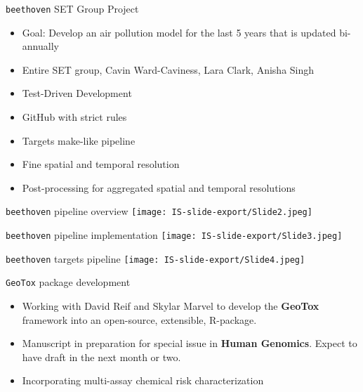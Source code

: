 \documentclass[
  ignorenonframetext,
]{beamer}
\providecommand{\tightlist}{%
  \setlength{\itemsep}{0pt}\setlength{\parskip}{0pt}}\usepackage{longtable,booktabs,array}
\begin{document}
\begin{frame}{\texttt{beethoven} SET Group Project}
\label{beethoven-set-group-project}
\begin{itemize}
\tightlist
\item
  Goal: Develop an air pollution model for the last 5 years that is
  updated bi-annually
\item
  Entire SET group, Cavin Ward-Caviness, Lara Clark, Anisha Singh
\item
  Test-Driven Development
\item
  GitHub with strict rules
\item
  Targets make-like pipeline
\item
  Fine spatial and temporal resolution
\item
  Post-processing for aggregated spatial and temporal resolutions
\end{itemize}
\end{frame}

\begin{frame}{\texttt{beethoven} pipeline overview}
\label{beethoven-pipeline-overview}
\texttt{[image: IS-slide-export/Slide2.jpeg]}
\end{frame}

\begin{frame}{\texttt{beethoven} pipeline implementation}
\label{beethoven-pipeline-implementation}
\texttt{[image: IS-slide-export/Slide3.jpeg]}
\end{frame}

\begin{frame}{\texttt{beethoven} targets pipeline}
\label{beethoven-targets-pipeline}
\texttt{[image: IS-slide-export/Slide4.jpeg]}
\end{frame}

\begin{frame}{\texttt{GeoTox} package development}
\label{geotox-package-development}
\begin{itemize}
\tightlist
\item
  Working with David Reif and Skylar Marvel to develop the
  \textbf{GeoTox} framework into an open-source, extensible, R-package.
\item
  Manuscript in preparation for special issue in \textbf{Human
  Genomics}. Expect to have draft in the next month or two.
\item
  Incorporating multi-assay chemical risk characterization
\end{itemize}
\end{frame}
\end{document}
